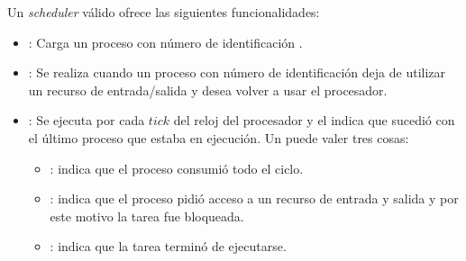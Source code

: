 Un \emph{scheduler} v\'alido ofrece las siguientes funcionalidades:
\begin{itemize}
	\item {}: Carga un proceso con n\'umero de identificaci\'on . 
	\item {}: Se realiza cuando un proceso con n\'umero de identificaci\'on  deja de utilizar un recurso de entrada/salida y desea volver a usar el procesador.
	\item {}: Se ejecuta por cada $tick$ del reloj del procesador  y el  indica que sucedi\'o con el \'ultimo proceso que estaba en ejecuci\'on. Un  puede valer tres cosas:
		\begin{itemize}
			\item {}: indica que el proceso consumi\'o todo el ciclo. 
			\item {}: indica que el proceso pidi\'o acceso a un recurso de entrada y salida y por este motivo la tarea fue bloqueada.
			\item {}: indica que la tarea termin\'o de ejecutarse.
		\end{itemize}
\end{itemize}
